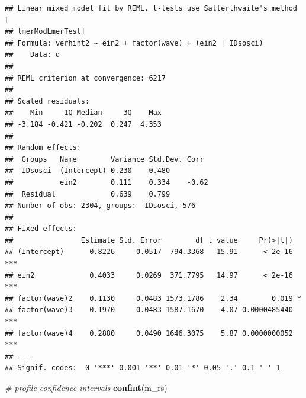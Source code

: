 \documentclass[
]{book}
\newenvironment{Shaded}{\begin{snugshade}}{\end{snugshade}}
\newcommand{\CommentTok}[1]{\textcolor[rgb]{0.56,0.35,0.01}{\textit{#1}}}
\newcommand{\DataTypeTok}[1]{\textcolor[rgb]{0.13,0.29,0.53}{#1}}
\newcommand{\DecValTok}[1]{\textcolor[rgb]{0.00,0.00,0.81}{#1}}
\newcommand{\KeywordTok}[1]{\textcolor[rgb]{0.13,0.29,0.53}{\textbf{#1}}}
\newcommand{\NormalTok}[1]{#1}
\newcommand{\OperatorTok}[1]{\textcolor[rgb]{0.81,0.36,0.00}{\textbf{#1}}}
\newcommand{\OtherTok}[1]{\textcolor[rgb]{0.56,0.35,0.01}{#1}}
\newcommand{\StringTok}[1]{\textcolor[rgb]{0.31,0.60,0.02}{#1}}
\begin{document}
\begin{Shaded}
\end{Shaded}

\begin{verbatim}
## Linear mixed model fit by REML. t-tests use Satterthwaite's method [
## lmerModLmerTest]
## Formula: verhint2 ~ ein2 + factor(wave) + (ein2 | IDsosci)
##    Data: d
## 
## REML criterion at convergence: 6217
## 
## Scaled residuals: 
##    Min     1Q Median     3Q    Max 
## -3.184 -0.421 -0.202  0.247  4.353 
## 
## Random effects:
##  Groups   Name        Variance Std.Dev. Corr 
##  IDsosci  (Intercept) 0.230    0.480         
##           ein2        0.111    0.334    -0.62
##  Residual             0.639    0.799         
## Number of obs: 2304, groups:  IDsosci, 576
## 
## Fixed effects:
##                Estimate Std. Error        df t value     Pr(>|t|)    
## (Intercept)      0.8226     0.0517  794.3368   15.91      < 2e-16 ***
## ein2             0.4033     0.0269  371.7795   14.97      < 2e-16 ***
## factor(wave)2    0.1130     0.0483 1573.1786    2.34        0.019 *  
## factor(wave)3    0.1970     0.0483 1587.1670    4.07 0.0000485440 ***
## factor(wave)4    0.2880     0.0490 1646.3075    5.87 0.0000000052 ***
## ---
## Signif. codes:  0 '***' 0.001 '**' 0.01 '*' 0.05 '.' 0.1 ' ' 1
\end{verbatim}

\begin{Shaded}
\begin{Highlighting}[]
\CommentTok{# profile confidence intervals}
\KeywordTok{confint}\NormalTok{(m_rs)}
\end{Highlighting}
\end{Shaded}
\end{document}
